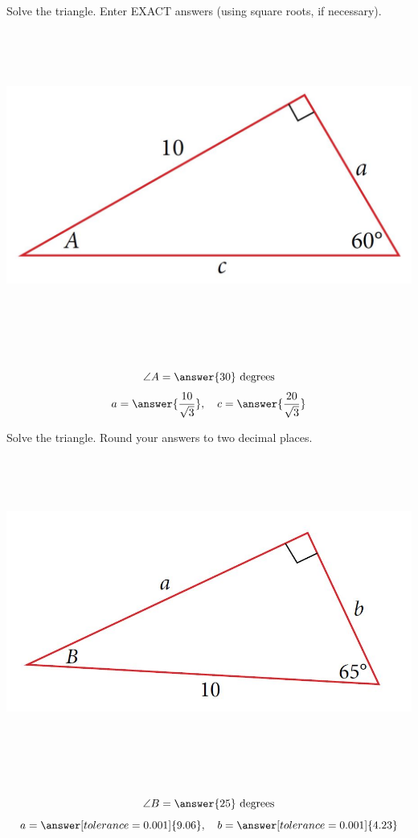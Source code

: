 \documentclass{ximera}
\begin{document}
\begin{problem}\label{prob:160hom10prob5}
Solve the triangle.  Enter EXACT answers (using square roots, if necessary).
\begin{image}
   
\includegraphics[height=4in]{160H10pic3.jpg}~
 
\end{image}

$$\angle A=\answer{30}\mbox{ degrees}$$
$$a=\answer{\frac{10}{\sqrt{3}}},\quad c=\answer{\frac{20}{\sqrt{3}}}$$
\end{problem}


\begin{problem}\label{prob:160hom10prob6}
Solve the triangle. Round your answers to two decimal places.
\begin{image}
   
\includegraphics[height=4in]{160H10pic4.jpg}~
 
\end{image}

$$\angle B=\answer{25}\mbox{ degrees}$$
$$a=\answer[tolerance=0.001]{9.06},\quad b=\answer[tolerance=0.001]{4.23}$$
\end{problem}
\end{document}
